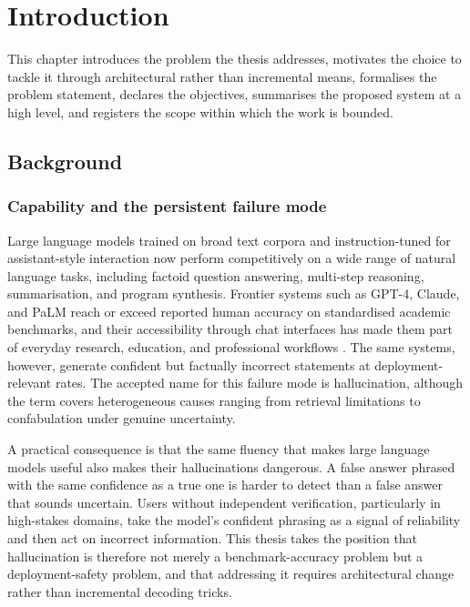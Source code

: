 \chapter{Introduction}
\label{ch:introduction}

This chapter introduces the problem the thesis addresses, motivates the choice to tackle it through architectural rather than incremental means, formalises the problem statement, declares the objectives, summarises the proposed system at a high level, and registers the scope within which the work is bounded.

\section{Background}
\label{sec:background}

\subsection{Capability and the persistent failure mode}
\label{sec:cap-failure}

Large language models trained on broad text corpora and instruction-tuned for assistant-style interaction now perform competitively on a wide range of natural language tasks, including factoid question answering, multi-step reasoning, summarisation, and program synthesis. Frontier systems such as GPT-4, Claude, and PaLM reach or exceed reported human accuracy on standardised academic benchmarks, and their accessibility through chat interfaces has made them part of everyday research, education, and professional workflows \cite{openai2023gpt4, anthropic2023claude, anil2023palm}. The same systems, however, generate confident but factually incorrect statements at deployment-relevant rates. The accepted name for this failure mode is hallucination, although the term covers heterogeneous causes ranging from retrieval limitations to confabulation under genuine uncertainty.

A practical consequence is that the same fluency that makes large language models useful also makes their hallucinations dangerous. A false answer phrased with the same confidence as a true one is harder to detect than a false answer that sounds uncertain. Users without independent verification, particularly in high-stakes domains, take the model's confident phrasing as a signal of reliability and then act on incorrect information. This thesis takes the position that hallucination is therefore not merely a benchmark-accuracy problem but a deployment-safety problem, and that addressing it requires architectural change rather than incremental decoding tricks.

